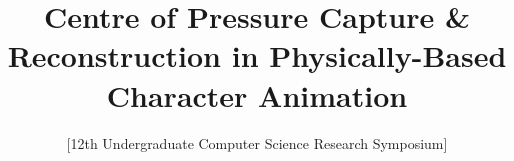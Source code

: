 \documentclass{sig-alternate-05-2015}
\begin{document}


\doi{}

\isbn{}



%

\title{Centre of Pressure Capture \& Reconstruction in Physically-Based Character Animation}

\subtitle{[12th Undergraduate Computer Science Research Symposium]}

%
%
%
%
%
\end{document}
